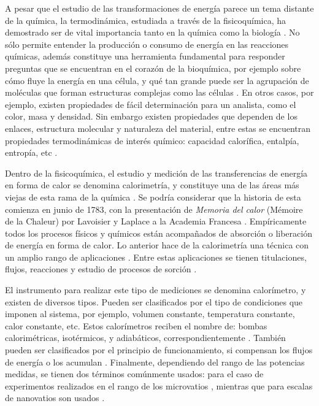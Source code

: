 	A pesar que el estudio de las transformaciones de energía parece un tema distante de la química, la termodinámica, estudiada a través de la fisicoquímica, ha demostrado ser de vital importancia tanto en la química como la biología \cite{atkins2011physical}. No sólo permite entender la producción o consumo de energía en las reacciones químicas, además constituye una herramienta fundamental para responder preguntas que se encuentran en el corazón de la bioquímica, por ejemplo sobre cómo fluye la energía en una célula, y qué tan grande puede ser la agrupación de moléculas que forman estructuras complejas como las células \cite{atkins2011physical}. En otros casos, por ejemplo, existen propiedades de fácil determinación para un analista, como el color, masa y densidad. Sin embargo existen propiedades que dependen de los enlaces, estructura molecular y naturaleza del material, entre estas se encuentran propiedades termodinámicas de interés químico: capacidad calorífica, entalpía, entropía, etc \cite{gaisford2016principles}.
	
	\newpage
	
	Dentro de la fisicoquímica, el estudio y medición de las transferencias de energía en forma de calor se denomina calorimetría, y constituye una de las áreas más viejas de esta rama de la química \cite{zielenkiewicz2006theory}. Se podría considerar que la historia de esta comienza en junio de 1783, con la presentación de \textit{Memoria del calor} (Mémoire de la Chaleur) por Lavoisier y Laplace a la Academia Francesa \cite{zielenkiewicz2006theory}. Empíricamente todos los procesos físicos y químicos están acompañados de absorción o liberación de energía en forma de calor. Lo anterior hace de la calorimetría una técnica con un amplio rango de aplicaciones \cite{wadso2001standards}. Entre estas aplicaciones se tienen titulaciones, flujos, reacciones y estudio de procesos de sorción \cite{gaisford2016principles}.
	
	El instrumento para realizar este tipo de mediciones se denomina calorímetro, y existen de diversos tipos. Pueden ser clasificados por el tipo de condiciones que imponen al sistema, por ejemplo, volumen constante, temperatura constante, calor constante, etc. Estos calorímetros reciben el nombre de: bombas calorimétricas, isotérmicos, y adiabáticos, correspondientemente \cite{gaisford2016principles, wadso2001standards}. También pueden ser clasificados por el principio de funcionamiento, si compensan los flujos de energía o los acumulan \cite{gaisford2016principles}. Finalmente, dependiendo del rango de las potencias medidas, se tienen dos términos comúnmente usados:  para el caso de experimentos realizados en el rango de los microvatios \cite{wadso2001standards, wadso2003new}, mientras que para escalas de nanovatios son usados  \cite{wadso2003new}.
	
